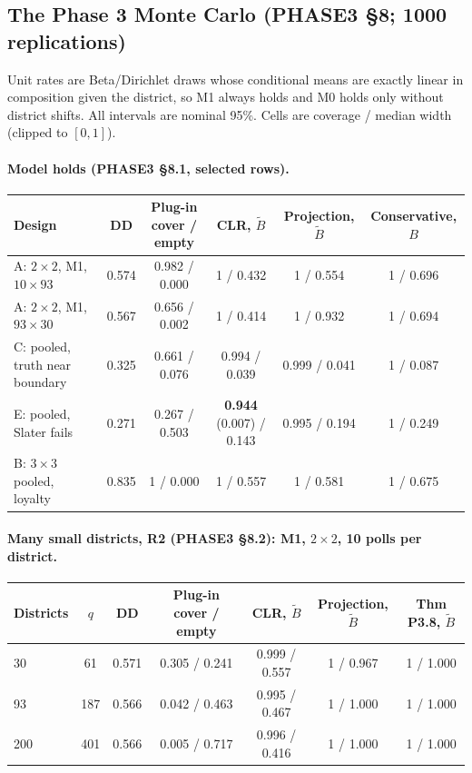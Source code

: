 \subsection{The Phase 3 Monte Carlo (PHASE3 \S8; 1000 replications)}

Unit rates are Beta/Dirichlet draws whose conditional means are exactly linear in
composition given the district, so M1 always holds and M0 holds only without
district shifts. All intervals are nominal 95\%. Cells are coverage / median
width (clipped to $[0,1]$).

\paragraph{Model holds (PHASE3 \S8.1, selected rows).}
\begin{center}\footnotesize
\begin{tabularx}{\linewidth}{@{}>{\raggedright\arraybackslash}X ccccc@{}}
\toprule
Design & DD & \shortstack{Plug-in\\cover / empty} & \shortstack{CLR,\\$\tilde B$} & \shortstack{Projection,\\$\tilde B$} & \shortstack{Conservative,\\$B$} \\
\midrule
A: $2\times2$, M1, $10\times93$ & 0.574 & 0.982 / 0.000 & 1 / 0.432 & 1 / 0.554 & 1 / 0.696 \\
A: $2\times2$, M1, $93\times30$ & 0.567 & 0.656 / 0.002 & 1 / 0.414 & 1 / 0.932 & 1 / 0.694 \\
C: pooled, truth near boundary & 0.325 & 0.661 / 0.076 & 0.994 / 0.039 & 0.999 / 0.041 & 1 / 0.087 \\
E: pooled, Slater fails & 0.271 & 0.267 / 0.503 & \textbf{0.944} (0.007) / 0.143 & 0.995 / 0.194 & 1 / 0.249 \\
B: $3\times3$ pooled, loyalty & 0.835 & 1 / 0.000 & 1 / 0.557 & 1 / 0.581 & 1 / 0.675 \\
\bottomrule
\end{tabularx}
\end{center}

\paragraph{Many small districts, R2 (PHASE3 \S8.2): M1, $2\times2$, 10 polls per district.}
\begin{center}\small
\begin{tabular}{@{}lcccccc@{}}
\toprule
Districts & $q$ & DD & Plug-in cover / empty & CLR, $\tilde B$ & Projection, $\tilde B$ & Thm P3.8, $\tilde B$ \\
\midrule
30 & 61 & 0.571 & 0.305 / 0.241 & 0.999 / 0.557 & 1 / 0.967 & 1 / 1.000 \\
93 & 187 & 0.566 & 0.042 / 0.463 & 0.995 / 0.467 & 1 / 1.000 & 1 / 1.000 \\
200 & 401 & 0.566 & 0.005 / 0.717 & 0.996 / 0.416 & 1 / 1.000 & 1 / 1.000 \\
\bottomrule
\end{tabular}
\end{center}

